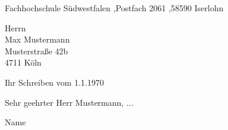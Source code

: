 \documentclass[a4paper, 10pt, parskip=off, headheight=25mm, footheight=25mm]{scrartcl}
\newcommand{\name}{{{Name}}}
\newcommand{\postfach}{Fachhochschule Südwestfalen \sep Postfach 2061 \sep 58590 Iserlohn}
\begin{document}
\daten %
\begin{addmargin}[0mm]{\randbreite}

\begin{absender}
\postfach
\end{absender}

\begin{empfaenger}
{{Herrn \\ Max Mustermann \\ Musterstraße 42b \\ 4711 Köln }}
\end{empfaenger}

\begin{betreff}
{{Ihr Schreiben vom 1.1.1970}}
\end{betreff}

\begin{text}
{{Sehr geehrter Herr Mustermann, ... }}
\end{text}

\vspace{15mm}
\name

\end{addmargin}
\end{document}
